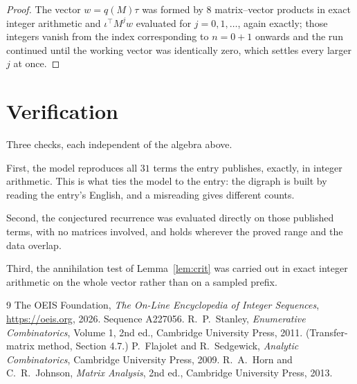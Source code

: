 \documentclass[11pt,a4paper]{article}
\theoremstyle{plain}
\theoremstyle{definition}
\begin{document}
\begin{proof}
The vector $w=q(M)\tau$ was formed by $8$ matrix--vector products in exact integer
arithmetic and $\iota^{\!\top}M^{j}w$ evaluated for $j=0,1,\dots$, again exactly; those
integers vanish from the index corresponding to $n=0+1$ onwards and the run continued
until the working vector was identically zero, which settles every larger $j$ at once.
\end{proof}

\section{Verification}

Three checks, each independent of the algebra above.

First, the model reproduces all $31$ terms the entry publishes, exactly, in integer
arithmetic. This is what ties the model to the entry: the digraph is built by reading the
entry's English, and a misreading gives different counts.

Second, the conjectured recurrence was evaluated directly on those published terms, with no
matrices involved, and holds wherever the proved range and the data overlap.

Third, the annihilation test of Lemma~\ref{lem:crit} was carried out in exact integer
arithmetic on the whole vector rather than on a sampled prefix.

\begin{thebibliography}{9}
 The OEIS Foundation, \emph{The On-Line Encyclopedia of Integer
Sequences}, \url{https://oeis.org}, 2026. Sequence A227056.
 R.~P.~Stanley, \emph{Enumerative Combinatorics}, Volume 1, 2nd ed.,
Cambridge University Press, 2011. (Transfer-matrix method, Section 4.7.)
 P.~Flajolet and R.~Sedgewick, \emph{Analytic Combinatorics}, Cambridge
University Press, 2009.
 R.~A.~Horn and C.~R.~Johnson, \emph{Matrix Analysis}, 2nd ed., Cambridge
University Press, 2013.
\end{thebibliography}
\end{document}
